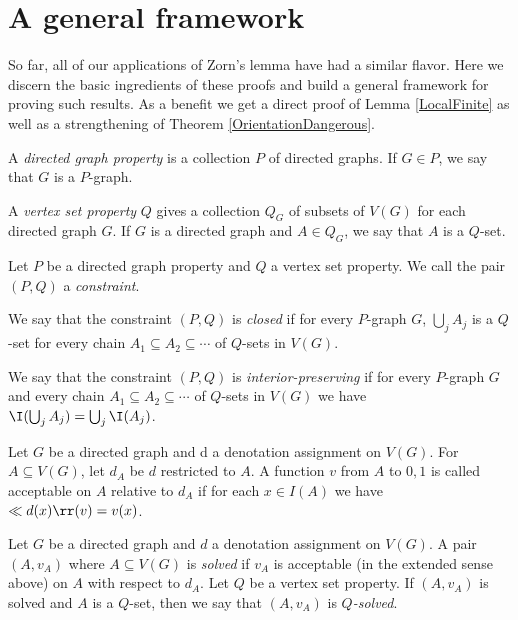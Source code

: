 \section{A general framework}
\label{GeneralCompactness}
So far, all of our applications of Zorn's lemma have had a similar flavor.  Here we discern the basic ingredients of these proofs and build a general framework for proving such results.  As a benefit we get a direct proof of Lemma \ref{LocalFinite} as well as a strengthening of Theorem \ref{OrientationDangerous}.

\begin{defn}
A \emph{directed graph property} is a collection $P$ of directed
graphs.  If $G \in P$, we say that $G$ is a $P$-graph.
\end{defn}

\begin{defn}
A \emph{vertex set property} $Q$ gives a collection $Q_G$ of subsets of
$V(G)$ for each directed graph $G$.  If $G$ is a directed graph and $A \in
Q_G$, we say that $A$ is a $Q$-set.
\end{defn}

\begin{defn}
Let $P$ be a directed graph property and $Q$ a vertex set property.
We call the pair $(P, Q)$ a \emph{constraint}.
\end{defn}

\begin{defn}
We say that the constraint $(P, Q)$ is \emph{closed} if for every $P$-graph $G$,
$\bigcup_j A_j$ is a $Q$-set for every chain $A_1 \subseteq A_2 \subseteq \cdots$
of $Q$-sets in $V(G)$.
\end{defn}

\begin{defn}
We say that the constraint $(P, Q)$ is \emph{interior-preserving} if for every
$P$-graph $G$ and every chain $A_1 \subseteq A_2 \subseteq \cdots$ of $Q$-sets in $V(G)$ we have $\I(\bigcup_j A_j) = \bigcup_j \I(A_j)$.
\end{defn}

\begin{defn}
Let $G$ be a directed graph and d a denotation assignment on $V(G)$.
For $A \subseteq V(G)$, let $d_A$ be $d$ restricted to $A$.  A function $v$ from
$A$ to ${0, 1}$ is called acceptable on $A$ relative to $d_A$ if for each $x
\in I(A)$ we have $\ll d(x) \rr (v) = v(x)$.
\end{defn}

\begin{defn}
Let $G$ be a directed graph and $d$ a denotation assignment on
$V(G)$. A pair $(A, v_A)$ where $A \subseteq V(G)$ is \emph{solved} if $v_A$ is
acceptable (in the extended sense above) on $A$ with respect to $d_A$.  Let $Q$ be a vertex set property. If $(A, v_A)$ is solved and $A$ is a $Q$-set, then we
say that $(A, v_A)$ is \emph{$Q$-solved}.
\end{defn}

